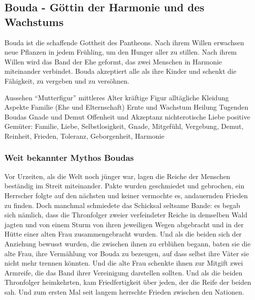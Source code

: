\subsection{Bouda - Göttin der Harmonie und des Wachstums}
Bouda ist die schaffende Gottheit des Pantheons. 
Nach ihrem Willen erwachsen neue Pflanzen in jedem Frühling, um den Hunger aller zu stillen. 
Nach ihrem Willen wird das Band der Ehe geformt, das zwei Menschen in Harmonie miteinander verbindet. 
Bouda akzeptiert alle als ihre Kinder und schenkt die Fähigkeit, zu vergeben und zu versöhnen.
\begin{outline}
	\1 Aussehen
		\2 ``Mutterfigur''
		\2 mittleres Alter 
		\2 kräftige Figur
		\2 alltägliche Kleidung 
	\1 Aspekte
		\2 Familie (Ehe und Elternschaft)
		\2 Ernte und Wachstum
		\2 Heilung
	\1 Tugenden Boudas
		\2 Gnade und Demut
		\2 Offenheit und Akzeptanz
		\2 nichterotische Liebe
	\1 positive Gemüter: Familie, Liebe, Selbstlosigkeit, Gnade, Mitgefühl, Vergebung, Demut, Reinheit, Frieden, Toleranz, Geborgenheit, Harmonie
\end{outline}

\subsubsection{Weit bekannter Mythos Boudas}
Vor Urzeiten, als die Welt noch jünger war, lagen die Reiche der Menschen beständig im Streit miteinander. 
Pakte wurden geschmiedet und gebrochen, ein Herrscher folgte auf den nächsten und keiner vermochte es, andauernden Frieden zu finden. 
Doch manchmal schmiedete das Schicksal seltsame Bande: 
es begab sich nämlich, dass die Thronfolger zweier verfeindeter Reiche in demselben Wald jagten und von einem Sturm von ihren jeweiligen Wegen abgebracht und in der Hütte einer alten Frau zusammengebracht wurden. 
Und als die beiden sich der Anziehung bewusst wurden, die zwischen ihnen zu erblühen begann, baten sie die alte Frau, ihre Vermählung vor Bouda zu bezeugen, auf dass selbst ihre Väter sie nicht mehr trennen könnten. 
Und die alte Frau schenkte ihnen zur Mitgift zwei Armreife, die das Band ihrer Vereinigung darstellen sollten. 
Und als die beiden Thronfolger heimkehrten, kam Friedfertigkeit über jeden, der die Reife der beiden sah. 
Und zum ersten Mal seit langem herrschte Frieden zwischen den Nationen.




